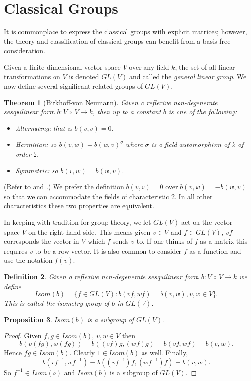 \documentclass[12pt]{article}
\newtheorem{thm}{Theorem}
\newtheorem{prop}[thm]{Proposition}
\newtheorem{defn}[thm]{Definition}
\begin{document}
\section{Classical Groups}

It is commonplace to express the classical groups with explicit matrices; however, the theory and classification of classical groups can benefit from a basis free consideration.

Given a finite dimensional vector space $V$ over any field $k$, the set of all linear transformations on $V$ is denoted $GL(V)$ and called the \emph{general linear group}.  We now define several significant related groups of $GL(V)$.

\begin{thm}[Birkhoff-von Neumann]\label{thm:class}
Given a reflexive non-degenerate sesquilinear form $b:V\times V\rightarrow k$, then 
up to a constant $b$ is one of the following:
\begin{itemize}
\item Alternating: that is $b(v,v)=0$.
\item Hermitian: so $b(v,w)=b(w,v)^{\sigma}$ where $\sigma$ is a field
automorphism of $k$ of order $2$.
\item Symmetric: so $b(v,w)=b(w,v)$.
\end{itemize}
\end{thm}
(Refer to \cite[Theorem 7.1]{Taylor} and \cite[Chapter V]{GW}.)
We prefer the definition $b(v,v)=0$ over $b(v,w)=-b(w,v)$ so that we can accommodate the fields of characteristic 2.  In all other characteristics these two properties are equivalent.

In keeping with tradition for group theory, we let $GL(V)$ act on the vector space $V$ on the right hand side.  This means given $v\in V$ and $f\in GL(V)$, 
$vf$ corresponds the vector in $V$ which $f$ sends $v$ to.  If one thinks of $f$ as a matrix this requires $v$ to be a row vector.  It is also common to consider $f$ as a function and use the notation $f(v)$.   

\begin{defn}
Given a reflexive non-degenerate sesquilinear form $b:V\times V\rightarrow k$
we define
\[Isom(b)=\{f\in GL(V):b(vf,wf)=b(v,w), v,w\in V\}.\]
This is called the isometry group of $b$ in $GL(V)$.
\end{defn}

\begin{prop}
$Isom(b)$ is a subgroup of $GL(V)$.
\end{prop}
\begin{proof}
Given $f,g\in Isom(b)$, $v,w\in V$ then 
\[ b(v(fg),w(fg))=b((vf)g,(wf)g)=b(vf,wf)=b(v,w).\]
Hence $fg\in Isom(b)$.  Clearly $1\in Isom(b)$ as well.  Finally, 
\[ b(vf^{-1},wf^{-1})=b((vf^{-1})f,(wf^{-1})f)=b(v,w).\]
So $f^{-1}\in Isom(b)$ and $Isom(b)$ is a subgroup of $GL(V)$.
\end{proof}
\end{document}
